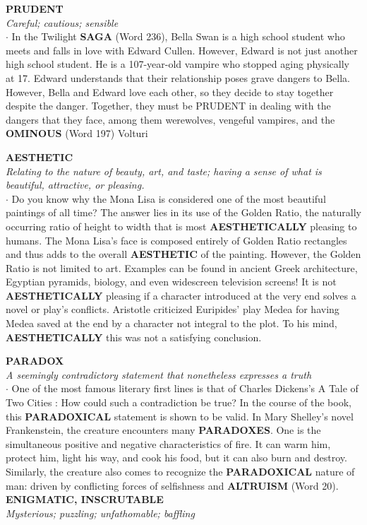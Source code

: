 \documentclass{exam}
\begin{document}
\begin{questions}
\question \textbf{PRUDENT}\\
\textit{Careful; cautious; sensible}\\

$\cdot$ In the Twilight \textbf{SAGA} (Word 236), Bella Swan is a high school student who meets and falls in love with Edward Cullen. However, Edward is not just another high school student. He is a 107-year-old vampire who stopped aging physically at 17. Edward understands that their relationship poses grave dangers to Bella. However, Bella and Edward love each other, so they decide to stay together despite the danger. Together, they must be PRUDENT in dealing with the dangers that they face, among them werewolves, vengeful vampires, and the \textbf{OMINOUS} (Word 197) Volturi

\question \textbf{AESTHETIC}\\
\textit{Relating to the nature of beauty, art, and taste; having a sense of what is beautiful, attractive, or pleasing.}\\

$\cdot$ Do you know why the Mona Lisa is considered one of the most beautiful paintings of all time? The answer lies in its use of the Golden Ratio, the naturally occurring ratio of height to width that is most \textbf{AESTHETICALLY} pleasing to humans. The Mona Lisa's face is composed entirely of Golden Ratio rectangles and thus adds to the overall \textbf{AESTHETIC} of the painting. However, the Golden Ratio is not limited to art. Examples can be found in ancient Greek architecture, Egyptian pyramids, biology, and even widescreen television screens! It is not \textbf{AESTHETICALLY} pleasing if a character introduced at the very end solves a novel or play's conflicts. Aristotle criticized Euripides' play Medea for having Medea saved at the end by a character not integral to the plot. To his mind, \textbf{AESTHETICALLY} this was not a satisfying conclusion.

\question \textbf{PARADOX}\\ 
\textit{A seemingly contradictory statement that nonetheless expresses a truth}\\

$\cdot$ One of the most famous literary first lines is that of Charles Dickens's A Tale of Two Cities :  How could such a contradiction be true? In the course of the book, this \textbf{PARADOXICAL} statement is shown to be valid. In Mary Shelley's novel Frankenstein, the creature encounters many \textbf{PARADOXES}. One is the simultaneous positive and negative characteristics of fire. It can warm him, protect him, light his way, and cook his food, but it can also burn and destroy. Similarly, the creature also comes to recognize the \textbf{PARADOXICAL} nature of man: driven by conflicting forces of selfishness and \textbf{ALTRUISM} (Word 20).
\question \textbf{ENIGMATIC, INSCRUTABLE}\\ \textit{Mysterious; puzzling; unfathomable; baffling}\\ 


\end{questions}
\end{document}
